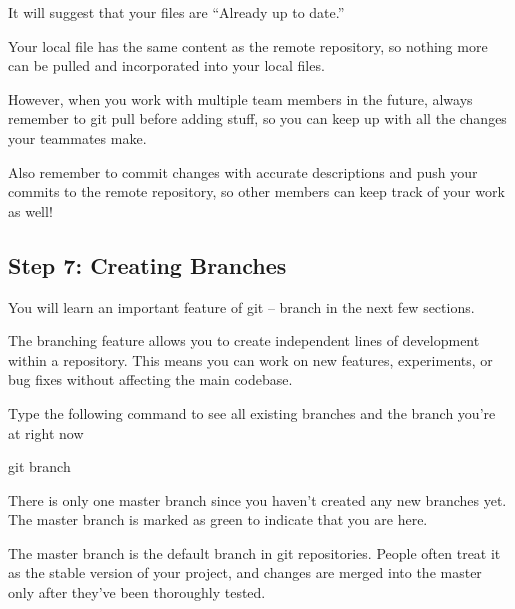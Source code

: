 \documentclass[
  letterpaper,
  DIV=11,
  numbers=noendperiod]{scrartcl}
\newenvironment{Shaded}{\begin{snugshade}}{\end{snugshade}}
\newcommand{\NormalTok}[1]{\textcolor[rgb]{0.00,0.23,0.31}{#1}}
\begin{document}
It will suggest that your files are ``Already up to date.''

Your local file has the same content as the remote repository, so
nothing more can be pulled and incorporated into your local files.

However, when you work with multiple team members in the future, always
remember to git pull before adding stuff, so you can keep up with all
the changes your teammates make.

Also remember to commit changes with accurate descriptions and push your
commits to the remote repository, so other members can keep track of
your work as well!

\subsection{Step 7: Creating Branches}\label{step-7-creating-branches}

\begin{tcolorbox}[enhanced jigsaw, breakable, opacityback=0, left=2mm, colback=white, arc=.35mm, toptitle=1mm, titlerule=0mm, opacitybacktitle=0.6, title=\textcolor{quarto-callout-tip-color}{\faLightbulb}\hspace{0.5em}{New concept alert!}, bottomtitle=1mm, rightrule=.15mm, toprule=.15mm, colframe=quarto-callout-tip-color-frame, bottomrule=.15mm, colbacktitle=quarto-callout-tip-color!10!white, leftrule=.75mm, coltitle=black]

You will learn an important feature of git -- branch in the next few
sections.

\end{tcolorbox}

The branching feature allows you to create independent lines of
development within a repository. This means you can work on new
features, experiments, or bug fixes without affecting the main codebase.

Type the following command to see all existing branches and the branch
you're at right now

\begin{Shaded}
\begin{Highlighting}[]
\NormalTok{git branch}
\end{Highlighting}
\end{Shaded}

There is only one master branch since you haven't created any new
branches yet. The master branch is marked as green to indicate that you
are here.

The master branch is the default branch in git repositories. People
often treat it as the stable version of your project, and changes are
merged into the master only after they've been thoroughly tested.
\end{document}
